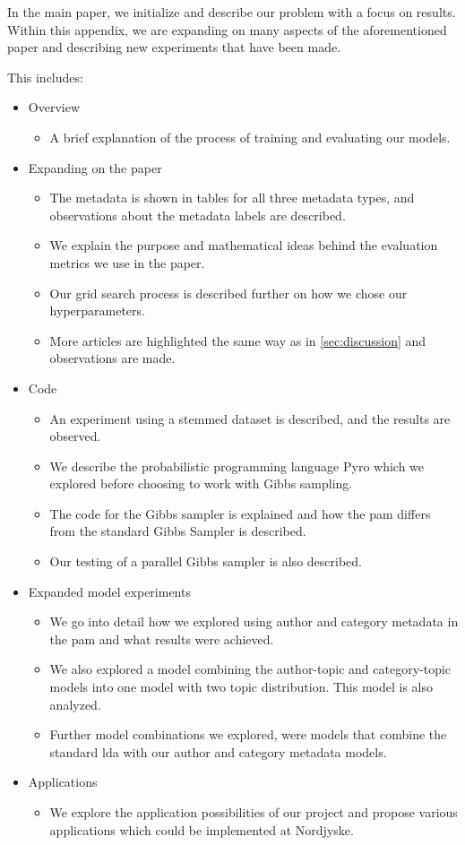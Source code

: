 In the main paper, we initialize and describe our problem with a focus on results.
Within this appendix, we are expanding on many aspects of the aforementioned paper and describing new experiments that have been made.

This includes:
\begin{itemize}
	\item Overview
	\begin{itemize}
		\item A brief explanation of the process of training and evaluating our models.
	\end{itemize}
	\item Expanding on the paper
	\begin{itemize}
		\item The metadata is shown in tables for all three metadata types, and observations about the metadata labels are described.
		\item We explain the purpose and mathematical ideas behind the evaluation metrics we use in the paper.
		\item Our grid search process is described further on how we chose our hyperparameters.
		\item More articles are highlighted the same way as in \autoref{sec:discussion} and observations are made.
	\end{itemize}
	\item Code
	\begin{itemize}
		\item An experiment using a stemmed dataset is described, and the results are observed.
		\item We describe the probabilistic programming language Pyro which we explored before choosing to work with Gibbs sampling.
		\item The code for the Gibbs sampler is explained and how the \gls{pam} differs from the standard Gibbs Sampler is described. 
		\item Our testing of a parallel Gibbs sampler is also described.
	\end{itemize}
	\item Expanded model experiments
	\begin{itemize}
		\item We go into detail how we explored using author and category metadata in the \gls{pam} and what results were achieved.
		\item We also explored a model combining the author-topic and category-topic models into one model with two topic distribution. This model is also analyzed.
		\item Further model combinations we explored, were models that combine the standard \gls{lda} with our author and category metadata models.
	\end{itemize}
	\item Applications
	\begin{itemize}
		\item We explore the application possibilities of our project and propose various applications which could be implemented at Nordjyske.
	\end{itemize}
\end{itemize}
